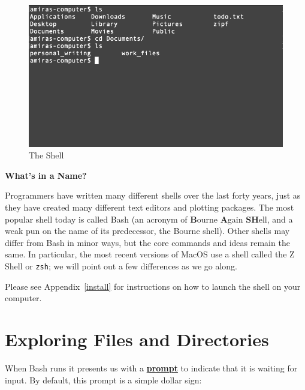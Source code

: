 \documentclass[
]{krantz}
\renewenvironment{quote}{\begin{VF}}{\end{VF}}
\newcommand{\gref}[2]{\hyperlink{#2}{\textbf{#1}}}
\begin{document}
\begin{figure}

{\centering \includegraphics[width=1\linewidth]{figures/bash-basics/the-shell} 

}

\caption{The Shell}\label{fig:bash-basics-repl}
\end{figure}

\begin{quote}
\textbf{What's in a Name?}

Programmers have written many different shells over the last forty years,
just as they have created many different text editors and plotting packages.
The most popular shell today is called Bash
(an acronym of \textbf{B}ourne \textbf{A}gain \textbf{SH}ell,
and a weak pun on the name of its predecessor,
the Bourne shell).
Other shells may differ from Bash in minor ways,
but the core commands and ideas remain the same.
In particular,
the most recent versions of MacOS use a shell called the Z Shell or \texttt{zsh};
we will point out a few differences as we go along.
\end{quote}

Please see Appendix~\ref{install} for instructions
on how to launch the shell on your computer.

\hypertarget{bash-basics-explore}{%
\section{Exploring Files and Directories}\label{bash-basics-explore}}

When Bash runs it presents us with a \gref{prompt}{prompt} to indicate that it is waiting for input.
By default,
this prompt is a simple dollar sign:
\end{document}
